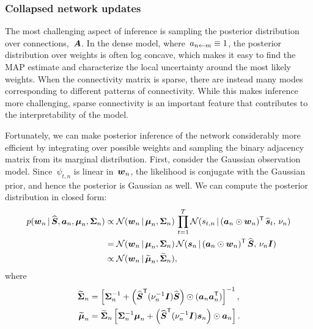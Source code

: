 \subsubsection{Collapsed network updates}
The most challenging aspect of inference is sampling the
posterior distribution over connections,~$\boldsymbol{A}$. In the
dense model, where~$a_{n \leftarrow m} \equiv 1$, the posterior
distribution over weights is often log concave, which
makes it easy to find the MAP estimate and characterize
the local uncertainty around the most likely weights.
When the connectivity matrix is sparse, there are instead
many modes corresponding to different patterns of
connectivity. While this makes inference more challenging,
sparse connectivity is an important feature that
contributes to the interpretability of the model.

Fortunately, we can make posterior inference of the
network considerably more efficient by integrating over
possible weights and sampling the binary adjacency
matrix from its marginal distribution. 
First, consider the Gaussian observation model.
Since~$\psi_{t,n}$ is linear in~$\boldsymbol{w}_n$, the likelihood
is conjugate with the Gaussian prior, and hence the
posterior is Gaussian as well. We can
compute the posterior distribution in closed form:
\begin{align}
  p(\boldsymbol{w}_n \,|\, \widehat{\boldsymbol{S}}, \boldsymbol{a}_n, \boldsymbol{\mu}_n, \boldsymbol{\Sigma}_n)
  &\propto
  \mathcal{N}(\boldsymbol{w}_n \,|\, \boldsymbol{\mu}_n, \boldsymbol{\Sigma}_n) \,
  \prod_{t=1}^T \mathcal{N}(s_{t,n} \,|\, (\boldsymbol{a}_n \odot \boldsymbol{w}_n)^{\mathsf{T}} \, \widehat{\boldsymbol{s}}_t, \, \nu_n) \\
  &= \mathcal{N}(\boldsymbol{w}_n \,|\, \boldsymbol{\mu}_n, \boldsymbol{\Sigma}_n) \,
  \mathcal{N}(\boldsymbol{s}_n \,|\, (\boldsymbol{a}_n \odot \boldsymbol{w}_n)^{\mathsf{T}} \, \widehat{\boldsymbol{S}}, \, \nu_n \boldsymbol{I}) \\
  \label{eq:w_conditional}
  &\propto \mathcal{N}(\boldsymbol{w}_n \,|\, \widetilde{\boldsymbol{\mu}}_n, \widetilde{\boldsymbol{\Sigma}}_n),
\end{align}
where
\begin{align}
  \widetilde{\boldsymbol{\Sigma}}_n &= \left[ \boldsymbol{\Sigma}_n^{-1} +
  \left(\widehat{\boldsymbol{S}}^{\mathsf{T}} (\nu_n^{-1} \boldsymbol{I}) \widehat{\boldsymbol{S}} \right) \odot (\boldsymbol{a}_n \boldsymbol{a}_n^{\mathsf{T}}) \right]^{-1}, \\
  \widetilde{\boldsymbol{\mu}}_n &= \widetilde{\boldsymbol{\Sigma}}_n \left[ \boldsymbol{\Sigma}_n^{-1} \boldsymbol{\mu}_n +
  \left(\widehat{\boldsymbol{S}}^{\mathsf{T}} (\nu_n^{-1} \boldsymbol{I})\boldsymbol{s}_n \right) \odot \boldsymbol{a}_n \right].
\end{align}

